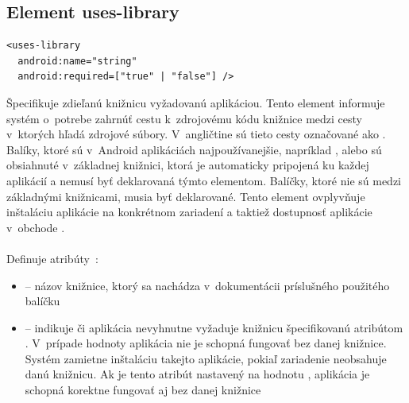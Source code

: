 \subsection{Element uses-library}
\lstset{language=XML}
\begin{lstlisting}
<uses-library
  android:name="string"
  android:required=["true" | "false"] />
\end{lstlisting}
Špecifikuje zdieľanú knižnicu vyžadovanú aplikáciou. Tento element informuje systém o~potrebe zahrnúť cestu k~zdrojovému kódu knižnice medzi cesty v~ktorých  hľadá zdrojové súbory. V~angličtine sú tieto cesty označované ako . Balíky, ktoré sú v~Android aplikáciách najpoužívanejšie, napríklad ,  alebo  sú obsiahnuté v~základnej knižnici, ktorá je automaticky pripojená ku každej aplikácií a nemusí byť deklarovaná týmto elementom. Balíčky, ktoré nie sú medzi základnými knižnicami, musia byť deklarované.  Tento element ovplyvňuje inštaláciu aplikácie na konkrétnom zariadení a taktiež dostupnosť aplikácie v~obchode .\\\\ Definuje atribúty~\cite{elUsesLib}:\\
\begin{itemize}
\item {} -- názov knižnice, ktorý sa nachádza v~dokumentácii príslušného použitého balíčku
\item {} -- indikuje či aplikácia nevyhnutne vyžaduje knižnicu špecifikovanú atribútom . V~prípade hodnoty  aplikácia nie je schopná fungovať bez danej knižnice. Systém zamietne inštaláciu takejto aplikácie, pokiaľ zariadenie neobsahuje danú knižnicu. Ak je tento atribút nastavený na hodnotu , aplikácia je schopná korektne fungovať aj bez danej knižnice
\end{itemize}